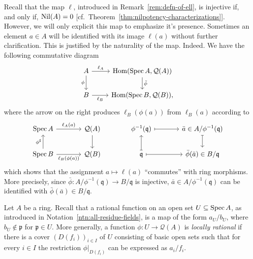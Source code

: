 \begin{ntn}
    Recall that the map\/ $\ell$, introduced in\/ {\rm Remark~\ref{rem:defn-of-ell}}, is injective if, and only if, $\operatorname{Nil}(A)=0$ {\rm[cf.~Theorem~\ref{thm:nilpotency-characterizations}]}. However, we will only explicit this map to emphasize it's presence. Sometimes an element\/ $a\in A$ will be identified with its image\/ $\ell(a)$ without further clarification. This is justified by the naturality of the map. Indeed. We have the following commutative diagram
    $$
        \begin{tikzcd}
            A
                    \arrow[d,"\phi"']
                    \arrow[r,"\ell_A"]
                &{\Hom(\Spec A,\mathcal Q(A))}
                    \arrow[d,"\tilde\phi"]\\
            B
                    \arrow[r,"\ell_B"']
                &{\Hom(\Spec B,\mathcal Q(B)),}
        \end{tikzcd}
    $$
    where the arrow on the right produces\/ $\ell_B(\phi(a))$ from\/ $\ell_B(a)$ according to
    $$
        \begin{tikzcd}[column sep=large]
            \Spec A
                    \arrow[r,"\ell_A(a)"]
                &\mathcal Q(A)
                    \arrow[d]
                &\phi^{-1}(\mathfrak q)
                    \arrow[r,mapsto]
                &\bar a\in A/\phi^{-1}(\mathfrak q)
                    \arrow[d,mapsto]\\
            \Spec B
                    \arrow[r,"\ell_B(\phi(a))"']
                    \arrow[u,"\phi^\sharp"]
                &\mathcal Q(B)&\mathfrak q
                    \arrow[u,mapsto]
                    \arrow[r,mapsto]
                &\bar\phi(\bar a)\in B/\mathfrak q
        \end{tikzcd}
    $$
    which shows that the assignment\/ $a\mapsto\ell(a)$ ``commutes'' with ring morphisms. More precisely, since\/ $\bar\phi\colon A/\phi^{-1}(\mathfrak q)\to B/\mathfrak q$ is injective, $\bar a\in A/\phi^{-1}(\mathfrak q)$ can be identified with\/ $\bar\phi(\bar a)\in B/\mathfrak q$.
\end{ntn}

\begin{defn}\label{defn:locally-rational}
    Let $A$ be a ring. Recall that a rational function on an open set $U\subseteq\operatorname{Spec} A$, as introduced in Notation~\ref{ntn:all-residue-fields}, is a map of the form $a_U/b_U$, where $b_U\notin\mathfrak p$ for $\mathfrak p\in U$. More generally, a function $\phi\colon U\to\mathcal Q(A)$ is \textsl{locally rational\/} if there is a cover\/ $(D(f_i))_{i\in I}$ of\/ $U$ consisting of basic open sets such that for every\/ $i\in I$ the restriction $\phi|_{D(f_i)}$ can be expressed as $a_i/f_i$.
\end{defn}


